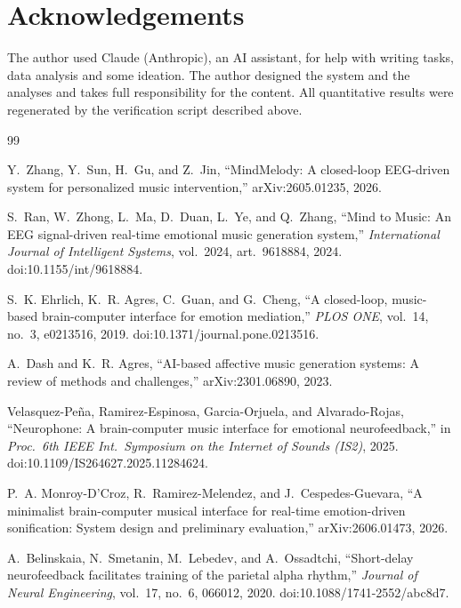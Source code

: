 \documentclass[11pt,a4paper]{article}
\begin{document}
\section*{Acknowledgements}

The author used Claude (Anthropic), an AI assistant, for help with writing tasks, data
analysis and some ideation. The author designed the system and the analyses and takes full
responsibility for the content. All quantitative results were regenerated by the
verification script described above.

\begin{thebibliography}{99}

Y.~Zhang, Y.~Sun, H.~Gu, and Z.~Jin, ``MindMelody: A closed-loop EEG-driven system for
personalized music intervention,'' arXiv:2605.01235, 2026.

S.~Ran, W.~Zhong, L.~Ma, D.~Duan, L.~Ye, and Q.~Zhang, ``Mind to Music: An EEG
signal-driven real-time emotional music generation system,'' \emph{International Journal of
Intelligent Systems}, vol.~2024, art.~9618884, 2024.
doi:10.1155/int/9618884.

S.~K. Ehrlich, K.~R. Agres, C.~Guan, and G.~Cheng, ``A closed-loop, music-based
brain-computer interface for emotion mediation,'' \emph{PLOS ONE}, vol.~14, no.~3,
e0213516, 2019.
doi:10.1371/journal.pone.0213516.

A.~Dash and K.~R. Agres, ``AI-based affective music generation systems: A review of
methods and challenges,'' arXiv:2301.06890, 2023.

Velasquez-Pe\~na, Ramirez-Espinosa, Garcia-Orjuela, and Alvarado-Rojas, ``Neurophone: A
brain-computer music interface for emotional neurofeedback,'' in \emph{Proc.\ 6th IEEE
Int.\ Symposium on the Internet of Sounds (IS2)}, 2025. doi:10.1109/IS264627.2025.11284624.

P.~A. Monroy-D'Croz, R.~Ramirez-Melendez, and J.~Cespedes-Guevara, ``A minimalist
brain-computer musical interface for real-time emotion-driven sonification: System design
and preliminary evaluation,'' arXiv:2606.01473, 2026.

A.~Belinskaia, N.~Smetanin, M.~Lebedev, and A.~Ossadtchi, ``Short-delay neurofeedback
facilitates training of the parietal alpha rhythm,'' \emph{Journal of Neural Engineering},
vol.~17, no.~6, 066012, 2020. doi:10.1088/1741-2552/abc8d7.


\end{thebibliography}
\end{document}

